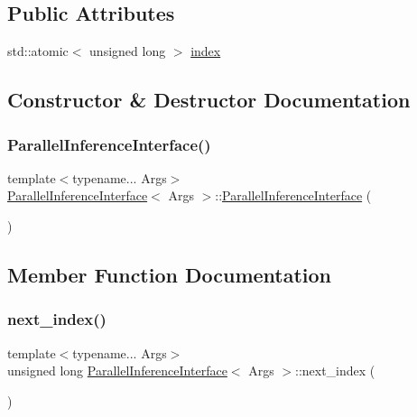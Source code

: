 \subsection*{Public Attributes}
\begin{DoxyCompactItemize}
\item 
std\+::atomic$<$ unsigned long $>$ \hyperlink{class_parallel_inference_interface_a7ae040da2f19cfb41851760759fc9b33}{index}
\end{DoxyCompactItemize}


\subsection{Constructor \& Destructor Documentation}
\mbox{\label{class_parallel_inference_interface_a59989833c3d7fde08746087b29c7dcef}} 
\subsubsection{\texorpdfstring{Parallel\+Inference\+Interface()}{ParallelInferenceInterface()}}
{\footnotesize\ttfamily template$<$typename... Args$>$ \\
\hyperlink{class_parallel_inference_interface}{Parallel\+Inference\+Interface}$<$ Args $>$\+::\hyperlink{class_parallel_inference_interface}{Parallel\+Inference\+Interface} (\begin{DoxyParamCaption}{ }\end{DoxyParamCaption})\hspace{0.3cm}{\ttfamily [inline]}}



\subsection{Member Function Documentation}
\mbox{\label{class_parallel_inference_interface_aaa1fe948131956b21a89c8c267e46b6c}} 
\subsubsection{\texorpdfstring{next\+\_\+index()}{next\_index()}}
{\footnotesize\ttfamily template$<$typename... Args$>$ \\
unsigned long \hyperlink{class_parallel_inference_interface}{Parallel\+Inference\+Interface}$<$ Args $>$\+::next\+\_\+index (\begin{DoxyParamCaption}{ }\end{DoxyParamCaption})\hspace{0.3cm}{\ttfamily [inline]}}



